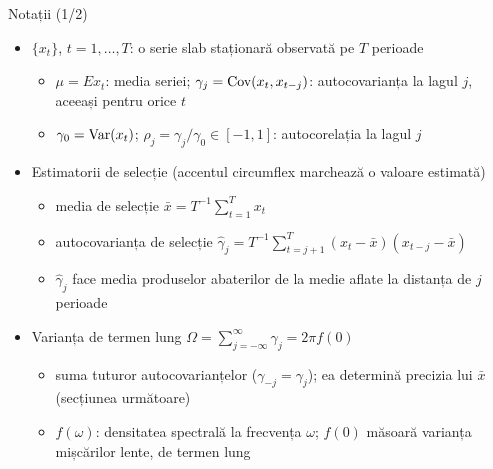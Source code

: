 \begin{frame}{Notații (1/2)}
\itemsize{\small}
\begin{itemize}
    \item $\{x_t\}$, $t = 1, \dots, T$: o serie slab staționară observată pe $T$ perioade
    \begin{itemize}
        \item $\mu = E x_t$: media seriei; $\gamma_j = \text{Cov}(x_t, x_{t-j})$: autocovarianța la lagul $j$, aceeași pentru orice $t$
        \item $\gamma_0 = \text{Var}(x_t)$; $\rho_j = \gamma_j/\gamma_0 \in [-1, 1]$: autocorelația la lagul $j$
    \end{itemize}
    \item Estimatorii de selecție (accentul circumflex marchează o valoare estimată)
    \begin{itemize}
        \item media de selecție $\bar{x} = T^{-1}\sum_{t=1}^{T} x_t$
        \item autocovarianța de selecție $\hat\gamma_j = T^{-1}\sum_{t=j+1}^{T}(x_t - \bar x)(x_{t-j} - \bar x)$
        \item $\hat\gamma_j$ face media produselor abaterilor de la medie aflate la distanța de $j$ perioade
    \end{itemize}
    \item Varianța de termen lung $\Omega = \sum_{j=-\infty}^{\infty}\gamma_j = 2\pi f(0)$
    \begin{itemize}
        \item suma tuturor autocovarianțelor ($\gamma_{-j} = \gamma_j$); ea determină precizia lui $\bar x$ (secțiunea următoare)
        \item $f(\omega)$: densitatea spectrală la frecvența $\omega$; $f(0)$ măsoară varianța mișcărilor lente, de termen lung
    \end{itemize}
\end{itemize}
\end{frame}

